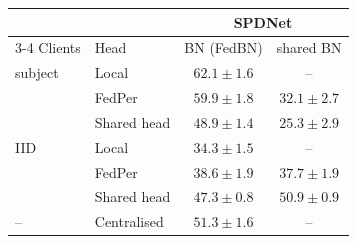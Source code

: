 \begin{tabular}{llcc}
\toprule
 & & \multicolumn{2}{c}{SPDNet} \\
\cmidrule(lr){3-4}
Clients & Head & BN (FedBN) & shared BN \\
\midrule
subject & Local & $\mathbf{62.1} \pm 1.6$ & -- \\
 & FedPer & $\mathbf{59.9} \pm 1.8$ & $32.1 \pm 2.7$ \\
 & Shared head & $\mathbf{48.9} \pm 1.4$ & $25.3 \pm 2.9$ \\
\midrule
IID & Local & $\mathbf{34.3} \pm 1.5$ & -- \\
 & FedPer & $\mathbf{38.6} \pm 1.9$ & $37.7 \pm 1.9$ \\
 & Shared head & $47.3 \pm 0.8$ & $\mathbf{50.9} \pm 0.9$ \\
\midrule
-- & Centralised & $\mathbf{51.3} \pm 1.6$ & -- \\
\bottomrule
\end{tabular}
